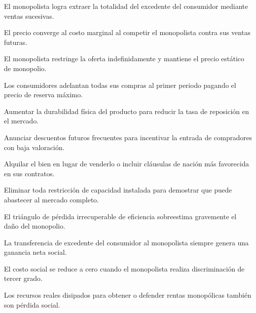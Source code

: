 \begin{opts}
    \item El monopolista logra extraer la totalidad del excedente del consumidor mediante ventas sucesivas.
    \item El precio converge al costo marginal al competir el monopolista contra sus ventas futuras.
    \item El monopolista restringe la oferta indefinidamente y mantiene el precio estático de monopolio.
    \item Los consumidores adelantan todas sus compras al primer periodo pagando el precio de reserva máximo.
\end{opts}

\begin{opts}
    \item Aumentar la durabilidad física del producto para reducir la tasa de reposición en el mercado.
    \item Anunciar descuentos futuros frecuentes para incentivar la entrada de compradores con baja valoración.
    \item Alquilar el bien en lugar de venderlo o incluir cláusulas de nación más favorecida en sus contratos.
    \item Eliminar toda restricción de capacidad instalada para demostrar que puede abastecer al mercado completo.
\end{opts}

\begin{opts}
    \item El triángulo de pérdida irrecuperable de eficiencia sobreestima gravemente el daño del monopolio.
    \item La transferencia de excedente del consumidor al monopolista siempre genera una ganancia neta social.
    \item El costo social se reduce a cero cuando el monopolista realiza discriminación de tercer grado.
    \item Los recursos reales disipados para obtener o defender rentas monopólicas también son pérdida social.
\end{opts}

